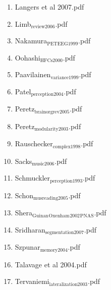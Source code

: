 \documentclass[11pt]{article}
\begin{document}
\begin{enumerate}
\begin{enumerate}
\item Langers et al 2007.pdf
\label{sec-1-1-1-1-30-29-22}

\item Limb$_{\text{review2006}}$.pdf
\label{sec-1-1-1-1-30-29-23}

\item Nakamura$_{\text{PETEEG1999}}$.pdf
\label{sec-1-1-1-1-30-29-24}

\item Oohashi$_{\text{HFCs2000}}$.pdf
\label{sec-1-1-1-1-30-29-25}

\item Paavilainen$_{\text{variance1999}}$.pdf
\label{sec-1-1-1-1-30-29-26}

\item Patel$_{\text{perception2004}}$.pdf
\label{sec-1-1-1-1-30-29-27}

\item Peretz$_{\text{brainorgrev2005}}$.pdf
\label{sec-1-1-1-1-30-29-28}

\item Peretz$_{\text{modularity2003}}$.pdf
\label{sec-1-1-1-1-30-29-29}

\item Rauschecker$_{\text{complex1998}}$.pdf
\label{sec-1-1-1-1-30-29-30}

\item Sacks$_{\text{music2006}}$.pdf
\label{sec-1-1-1-1-30-29-31}

\item Schmuckler$_{\text{perception1993}}$.pdf
\label{sec-1-1-1-1-30-29-32}

\item Schon$_{\text{musreading2005}}$.pdf
\label{sec-1-1-1-1-30-29-33}

\item Shera$_{\text{Guinan}}$$_{\text{Oxenham}}$$_{\text{2002}}$$_{\text{PNAS}}$.pdf
\label{sec-1-1-1-1-30-29-34}

\item Sridharan$_{\text{segmentation2007}}$.pdf
\label{sec-1-1-1-1-30-29-35}

\item Szpunar$_{\text{memory2004}}$.pdf
\label{sec-1-1-1-1-30-29-36}

\item Talavage et al 2004.pdf
\label{sec-1-1-1-1-30-29-37}

\item Tervaniemi$_{\text{lateralization2003}}$.pdf
\label{sec-1-1-1-1-30-29-38}


\end{enumerate}
\end{enumerate}
\end{document}
